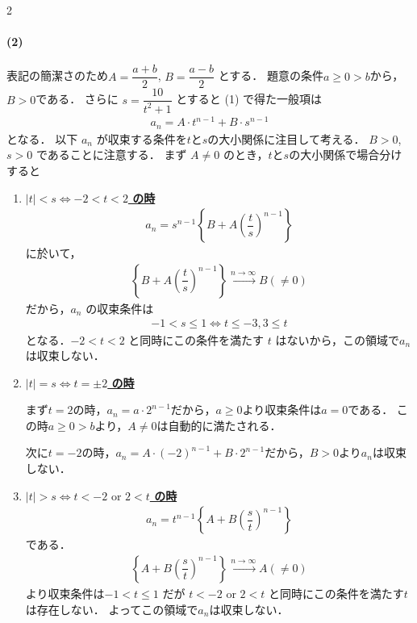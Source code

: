 \documentclass[../../main.tex]{subfiles}
\begin{document}
\begin{multicols}{2}
  \paragraph{(2)}
  表記の簡潔さのため$A = \dfrac{a+b}{2}$, $B = \dfrac{a-b}{2}$ とする．
  題意の条件$a \ge 0 > b$から，$B>0$である．
  さらに $s = \dfrac{10}{t^2+1}$ とすると (1) で得た一般項は
  \begin{align}
    a_n = A \cdot t^{n-1} + B \cdot s^{n-1}
  \end{align}
  となる．
  以下 $a_n$ が収束する条件を$t$と$s$の大小関係に注目して考える．
  $B>0$, $s>0$ であることに注意する．
  まず $A \ne 0$ のとき，$t$と$s$の大小関係で場合分けすると
  \begin{enumerate}
    \item[$1^\circ$] \underline{\textbf{$|t| < s \iff -2 < t < 2$ の時}}
      \begin{align}
        a_n = s^{n-1} \left\{ B + A\left(\dfrac{t}{s}\right)^{n-1} \right\}
      \end{align}
      に於いて，
      \begin{align}
        \left\{ B+A\left(\dfrac{t}{s}\right)^{n-1} \right\} \xrightarrow{n \to \infty} B (\ne 0)
      \end{align}
      だから，$a_n$ の収束条件は
      \begin{align}
        -1 < s \le 1 \iff t \le -3, 3 \le t
      \end{align}
      となる．$-2 < t < 2$ と同時にこの条件を満たす $t$ はないから，この領域で$a_n$は収束しない．
    \item[$2^\circ$] \underline{\textbf{$|t| = s \iff t = \pm 2$ の時}}

      まず$t=2$の時，$a_n = a \cdot 2^{n-1}$だから，$a\ge 0$より収束条件は$a=0$である．
      この時$a \ge 0 > b$より，$ A \neq 0$は自動的に満たされる．

      次に$t=-2$の時，$a_n = A\cdot(-2)^{n-1} + B\cdot 2^{n-1}$だから，$B>0$より$a_n$は収束しない．
    \item[$3^\circ$] \underline{\textbf{$|t| > s \iff t < -2 \text{ or } 2 < t$ の時}}
      \begin{align}
        a_n = t^{n-1} \left\{ A + B\left(\dfrac{s}{t}\right)^{n-1} \right\}
      \end{align}
      である．
      \begin{align}
        \left\{ A+B\left(\dfrac{s}{t}\right)^{n-1} \right\} \xrightarrow{n \to \infty} A (\ne 0)
      \end{align}
      より収束条件は$-1 < t \le 1$ だが $t < -2 \text{ or } 2 < t$ と同時にこの条件を満たす$t$は存在しない．
      よってこの領域で$a_n$は収束しない．
  \end{enumerate}


\end{multicols}
\end{document}
